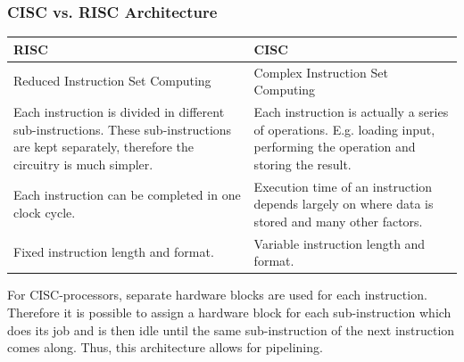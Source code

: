 		\subsubsection{CISC vs. RISC Architecture}
		\begin{table}[H]
			\centering
			\begin{tabular}{|p{0.425\textwidth}|p{}|}
				\hline
				\textbf{RISC}
					& \textbf{CISC}\\
				\hline
				Reduced Instruction Set Computing
					& Complex Instruction Set Computing\\
				\hline
				Each instruction is divided in different sub-instructions. These sub-instructions are kept separately, therefore the circuitry is much simpler.
					& Each instruction is actually a series of operations. E.g. loading input, performing the operation and storing the result.\\
				\hline
				Each instruction can be completed in one clock cycle.
					& Execution time of an instruction depends largely on where data is stored and many other factors.\\
				\hline
				Fixed instruction length and format.
					& Variable instruction length and format.\\
				\hline
			\end{tabular}
		\end{table}		
		
		For CISC-processors, separate hardware blocks are used for each instruction. Therefore it is possible to assign a hardware block for each sub-instruction which does its job and is then idle until the same sub-instruction of the next instruction comes along. Thus, this architecture allows for pipelining.
		

